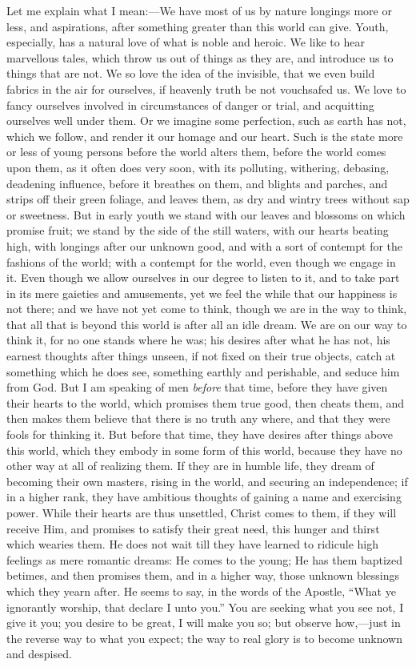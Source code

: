 Let me explain what I mean:—We have most of us by nature longings
more or less, and aspirations, after something greater than this world
can give. Youth, especially, has a natural love of what is noble and
heroic. We like to hear marvellous tales, which throw us out of things
as they are, and introduce us to things that are not. We so love the
idea of the invisible, that we even build fabrics in the air for
ourselves, if heavenly truth be not vouchsafed us. We love to fancy
ourselves involved in circumstances of danger or trial, and acquitting
ourselves well under them. Or we imagine some perfection, such as
earth has not, which we follow, and render it our homage and our
heart. Such is the state more or less of young persons before the
world alters them, before the world comes upon them, as it often does
very soon, with its polluting, withering, debasing, deadening
influence, before it breathes on them, and blights and parches, and
strips off their green foliage, and leaves them, as dry and wintry
trees without sap or sweetness. But in early youth we stand with our
leaves and blossoms on which promise fruit; we stand by the side of
the still waters, with our hearts beating high, with longings after
our unknown good, and with a sort of contempt for the fashions of the
world; with a contempt for the world, even though we engage in it.
Even though we allow ourselves in our degree to listen to it, and
to
take part in its mere gaieties and amusements, yet we feel the while
that our happiness is not there; and we have not yet come to think,
though we are in the way to think, that all that is beyond this world
is after all an idle dream. We are on our way to think it, for no one
stands where he was; his desires after what he has not, his earnest
thoughts after things unseen, if not fixed on their true objects,
catch at something which he does see, something earthly and
perishable, and seduce him from God. But I am speaking of men \emph{before}
that time, before they have given their hearts to the world, which
promises them true good, then cheats them, and then makes them believe
that there is no truth any where, and that they were fools for
thinking it. But before that time, they have desires after things
above this world, which they embody in some form of this world,
because they have no other way at all of realizing them. If they are
in humble life, they dream of becoming their own masters, rising in
the world, and securing an independence; if in a higher rank, they
have ambitious thoughts of gaining a name and exercising power. While
their hearts are thus unsettled, Christ comes to them, if they will
receive Him, and promises to satisfy their great need, this hunger and
thirst which wearies them. He does not wait till they have learned to
ridicule high feelings as mere romantic dreams: He comes to the young;
He has them baptized betimes, and then promises them, and in a higher
way, those unknown blessings which they yearn after. He seems to say,
in the words of the Apostle, ``What ye ignorantly worship, that
declare I unto you.'' You are seeking what you see not, I give it
you; you desire to be great, I will make you so; but observe how,—just
in the reverse way to what you expect; the way to real glory is to
become unknown and despised.

